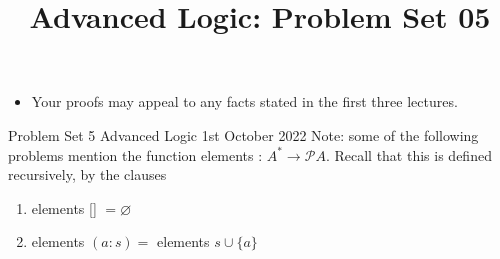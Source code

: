 \documentclass[10pt]{article}
\title{Advanced Logic: Problem Set 05 }
\author{}
\date{}
\begin{document}
\maketitle
\begin{itemize}
  \item Your proofs may appeal to any facts stated in the first three lectures.

\end{itemize}
Problem Set 5
Advanced Logic
1st October 2022
Note: some of the following problems mention the function elements : $A^* \rightarrow \mathcal{P} A$. Recall that this is defined recursively, by the clauses
\begin{enumerate}
    \item elements [] $=\varnothing$
    \item elements $(a: s)=$ elements $s \cup\{a\}$

\end{enumerate}
\end{document}

